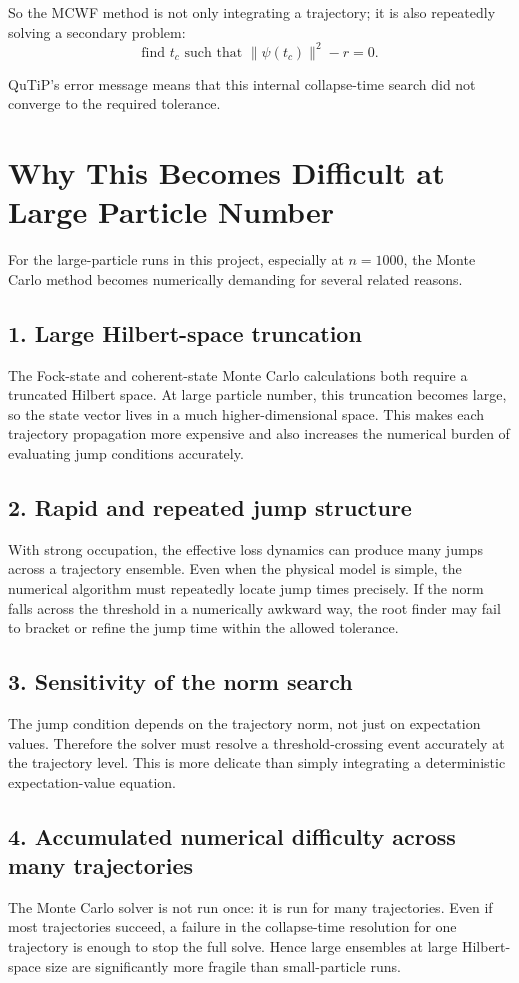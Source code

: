 \documentclass[12pt]{article}
\begin{document}
So the MCWF method is not only integrating a trajectory; it is also repeatedly solving a secondary problem:
\[
\text{find } t_c \text{ such that } \lVert \psi(t_c)\rVert^2 - r = 0.
\]

QuTiP's error message means that this internal collapse-time search did not converge to the required tolerance.

\section*{Why This Becomes Difficult at Large Particle Number}
For the large-particle runs in this project, especially at $n=1000$, the Monte Carlo method becomes numerically demanding for several related reasons.

\subsection*{1. Large Hilbert-space truncation}
The Fock-state and coherent-state Monte Carlo calculations both require a truncated Hilbert space. At large particle number, this truncation becomes large, so the state vector lives in a much higher-dimensional space. This makes each trajectory propagation more expensive and also increases the numerical burden of evaluating jump conditions accurately.

\subsection*{2. Rapid and repeated jump structure}
With strong occupation, the effective loss dynamics can produce many jumps across a trajectory ensemble. Even when the physical model is simple, the numerical algorithm must repeatedly locate jump times precisely. If the norm falls across the threshold in a numerically awkward way, the root finder may fail to bracket or refine the jump time within the allowed tolerance.

\subsection*{3. Sensitivity of the norm search}
The jump condition depends on the trajectory norm, not just on expectation values. Therefore the solver must resolve a threshold-crossing event accurately at the trajectory level. This is more delicate than simply integrating a deterministic expectation-value equation.

\subsection*{4. Accumulated numerical difficulty across many trajectories}
The Monte Carlo solver is not run once: it is run for many trajectories. Even if most trajectories succeed, a failure in the collapse-time resolution for one trajectory is enough to stop the full solve. Hence large ensembles at large Hilbert-space size are significantly more fragile than small-particle runs.
\end{document}
